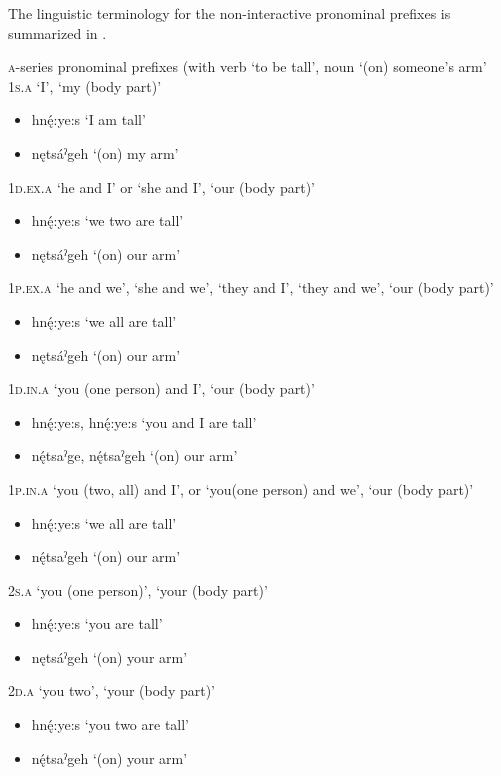 The linguistic terminology for the non-interactive pronominal prefixes is summarized in .

\ea\label{ex:pplingex200} \textsc{a}-series pronominal prefixes (with verb  ‘to be tall’, noun  ‘(on) someone’s arm’
\ea \textsc{1s.a} ‘I’, ‘my (body part)’
\begin{itemize}
    \item   {}hnę́:ye:s ‘I am tall’
    \item   {}nętsáˀgeh ‘(on) my arm’
\end{itemize}
\ex \textsc{1d.ex.a} ‘he and I’ or ‘she and I’, ‘our (body part)’
\begin{itemize}
    \item   {}hnę́:ye:s ‘we two are tall’
    \item   {}nętsáˀgeh ‘(on) our arm’
\end{itemize}
\ex \textsc{1p.ex.a} ‘he and we’, ‘she and we’, ‘they and I’, ‘they and we’, ‘our (body part)’
\begin{itemize}
    \item   {}hnę́:ye:s ‘we all are tall’
    \item  {}nętsáˀgeh ‘(on) our arm’
\end{itemize}
\ex \textsc{1d.in.a} ‘you (one person) and I’, ‘our (body part)’
\begin{itemize}
    \item  {}hnę́:ye:s, hnę́:ye:s ‘you and I are tall’
    \item   {}nę́tsaˀge, nę́tsaˀgeh ‘(on) our arm’
\end{itemize}
\ex \textsc{1p.in.a} ‘you (two, all) and I’, or ‘you(one person) and we’, ‘our (body part)’
\begin{itemize}
    \item   {}hnę́:ye:s ‘we all are tall’
    \item   {}nę́tsaˀgeh ‘(on) our arm’
\end{itemize}
\ex \textsc{2s.a} ‘you (one person)’, ‘your (body part)’
\begin{itemize}
    \item   {}hnę́:ye:s ‘you are tall’
    \item   {}nętsáˀgeh ‘(on) your arm’
\end{itemize}
\ex \textsc{2d.a} ‘you two’, ‘your (body part)’
\begin{itemize}
    \item   {}hnę́:ye:s ‘you two are tall’
    \item   {}nę́tsaˀgeh ‘(on) your arm’
\end{itemize}
